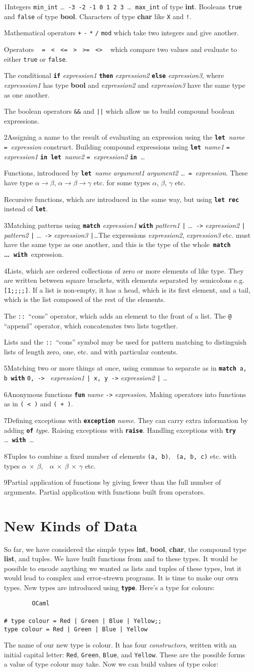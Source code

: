 \documentclass[]{book}
\makeatletter
\newcommand\upquote[1]{\textquotesingle#1\textquotesingle}
\newcommand{\sofarstartingoff}{

\noindent \lettrine[loversize=0.1,nindent=0em]{1}{}Integers \texttt{min\_int} \ldots\ \texttt{-3}\ \texttt{-2}\ \texttt{-1}\ \texttt{0}\ \texttt{1}\ \texttt{2}\ \texttt{3}\ \ldots\ \texttt{max\_int} of type \textbf{\textsf{int}}. Booleans \texttt{true} and \texttt{false} of type \textbf{\textsf{bool}}. \noindent Characters of type \textsf{\textbf{char}} like \texttt{\upquote{X}} and \texttt{\upquote{!}}.
\vspace{2mm}

\noindent Mathematical operators \texttt{+} \texttt{-} \texttt{*} \texttt{/} \texttt{mod} which take two integers and give another.

\vspace{2mm}

\noindent Operators \ \!\! \texttt{=\ \!\!} \texttt{<\ \!\!} \texttt{<=\ \!\!} \texttt{>\ \!\!} \texttt{>=\ \!\!} \texttt{<>} \ \!\! which compare two values and evaluate to either \texttt{true} or \texttt{false}.

\vspace{2mm}

\noindent The conditional \textbf{\texttt{if}} \textit{expression1} \textbf{\texttt{then}} \textit{expression2} \textbf{\texttt{else}} \textit{expression3}, where \textit{expresssion1} has type \textsf{\textbf{bool}} and \textit{expression2} and \textit{expression3} have the same type as one another.

\vspace{2mm}

\noindent The boolean operators \texttt{\&\&} and \texttt{||} which allow us to build compound boolean expressions.}
\newcommand{\sofarfunctions}
{
\noindent\lettrine[loversize=0.1,findent=2pt,nindent=0em]{2}{}Assigning a name to the result of evaluating an expression using the \textbf{\texttt{let}}\ \textit{name} \texttt{=}\ \textit{expression} construct. Building compound expressions using \textbf{\texttt{let}}\ \textit{name1} \texttt{=} \textit{expression1} \textbf{\texttt{in}}\ \textbf{\texttt{let}}\ \textit{name2} \texttt{=}\ \textit{expression2} \textbf{\texttt{in}}\ \ldots

\vspace{2mm} 

\noindent Functions, introduced by \textbf{\texttt{let}}\ \textit{name} \textit{argument1} \textit{argument2} \ldots\ \texttt{=}\ \textit{expression}. These have type $\alpha \rightarrow \beta$, $\alpha \rightarrow \beta \rightarrow \gamma$ etc. for some types $\alpha$, $\beta$, $\gamma$ etc.

\vspace{2mm}

\noindent Recursive functions, which are introduced in the same way, but using \textbf{\texttt{let\!\! rec}} instead of \textbf{\texttt{let}}.}
\newcommand{\sofarcasebycase}
{\noindent \lettrine[loversize=0.1,findent=2pt,nindent=0em]{3}{}Matching patterns using \textbf{\texttt{match}} \textit{expression1} \textbf{\texttt{with}} \textit{pattern1} \texttt{|} \ldots\ \texttt{->} \textit{expression2} \texttt{|} \textit{pattern2} \texttt{|} \ldots\ \texttt{->} \textit{expression3} \texttt{|}\ldots The expressions \textit{expression2}, \textit{expression3} etc. must have the same type as one another, and this is the type of the whole \,\textbf{\texttt{match} \ldots\ \texttt{with}}\, expression.}
\newcommand{\sofarlistingthings}
{
\noindent \lettrine[loversize=0.1,findent=2pt,nindent=0em]{4}{}Lists, which are ordered collections of zero or more elements of like type. They are written between square brackets, with elements separated by semicolons e.g. \texttt{[1;\! 2;\! 3;\! 4;\! 5]}. If a list is non-empty, it has a head, which is its first element, and a tail, which is the list composed of the rest of the elements.

\vspace{2mm}

\noindent The \texttt{::}\ ``cons'' operator, which adds an element to the front of a list. The \texttt{@} ``append'' operator, which concatenates two lists together.

\vspace{2mm}

\noindent Lists and the \texttt{::}\ ``cons'' symbol may be used for pattern matching to distinguish lists of length zero, one, etc. and with particular contents.}
\newcommand{\sofarsortingthings}
{
\noindent \lettrine[loversize=0.1,findent=2pt,nindent=0em]{5}{}Matching two or more things at once, using commas to separate as in \texttt{\textbf{match}}\, \texttt{a,\!\! b}\, \textbf{\texttt{with}} \texttt{0,\!\! 0\! ->\! }\! \textit{expression1} \texttt{|\ \!x,\!\! y\! ->} \textit{expression2} \texttt{|} \ldots
}
\newcommand{\sofarfunctionsuponfunctions}
{
\noindent \lettrine[loversize=0.1,findent=2pt,nindent=0em]{6}{}Anonymous functions \textbf{\texttt{fun}} \textit{name} \texttt{->} \textit{expression}. Making operators into functions as in \texttt{(\! <\! )} and \texttt{(\! +\! )}.
}
\newcommand{\sofarwhenthingsgowrong}
{
\noindent \lettrine[loversize=0.1,findent=2pt,nindent=0em]{7}{}Defining exceptions with \textbf{\texttt{exception}} \textit{name}. They can carry extra information by adding \textbf{\texttt{of}} \textit{type}. Raising exceptions with \textbf{\texttt{raise}}. Handling exceptions with \textbf{\texttt{try}} \ldots\ \textbf{\texttt{with}}\ \ldots}
\newcommand{\sofarlookingthingsup}
{
\noindent \lettrine[loversize=0.1,findent=2pt,nindent=0em]{8}{}Tuples to combine a fixed number of elements \texttt{(a,\! b)},\!    \ \texttt{(a,\! b,\! c)} etc. with types \textsf{\textbf{$\alpha$ $\times$ $\beta$}},\ \  \textsf{\textbf{$\alpha$ $\times$ $\beta$ $\times$ $\gamma$}} etc.
}
\newcommand{\sofarmorewithfunctions}
{
\noindent \lettrine[loversize=0.1,findent=2pt,nindent=0em]{9}{}Partial application of functions by giving fewer than the full number of arguments. Partial application with functions built from operators.
}
\newcommand{\smspace}{\vspace{4mm}}
\makeatother
\begin{document}
\begin{multicols*}{2}
\footnotesize
\sofarstartingoff

\vspace{\baselineskip}
\sofarfunctions

\vspace{\baselineskip}
\sofarcasebycase

\vspace{\baselineskip}
\sofarlistingthings

\vspace{\baselineskip}
\sofarsortingthings

\vspace{\baselineskip}
\sofarfunctionsuponfunctions

\vspace{\baselineskip}
\sofarwhenthingsgowrong

\vspace{\baselineskip}
\sofarlookingthingsup

\vspace{\baselineskip}
\sofarmorewithfunctions

\end{multicols*}

\pagestyle{empty}


\chapter{New Kinds of Data}
\pagestyle{fancy}
\label{newkindsofdata}

So far, we have considered the simple types \textbf{\textsf{int}}, \textbf{\textsf{bool}}, \textbf{\textsf{char}}, the compound type \textbf{\textsf{list}}, and tuples. We have built functions from and to these types. It would be possible to encode anything we wanted as lists and tuples of these types, but it would lead to complex and error-strewn programs. It is time to make our own types. New types are introduced using \texttt{\textbf{type}}. Here's a type for colours:

\smspace
\noindent\verb!        OCaml!\\
\noindent\\
\noindent\verb!# type colour = Red | Green | Blue | Yellow;;!\\
\noindent\verb!type colour = Red | Green | Blue | Yellow!
\smspace

\noindent The name of our new type is \textsf{colour}. It has four \textit{constructors}, written with an initial capital letter: \texttt{Red}, \texttt{Green}, \texttt{Blue}, and \texttt{Yellow}. These are the possible forms a value of type \textsf{colour} may take. Now we can build values of type \textsf{color}:
\end{document}
